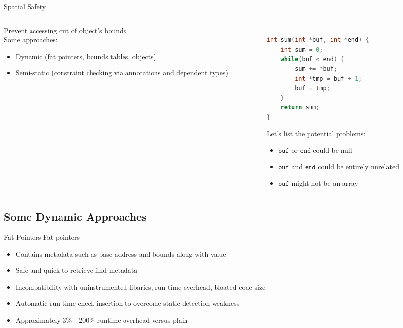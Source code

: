 \documentclass[aspectratio=169]{beamer}
\begin{document}
\begin{frame}[fragile]{Spatial Safety}
  \footnotesize
  \begin{columns}[T]
    \begin{column}{0.45\textwidth}
        Prevent accessing out of object's bounds
        \\
        Some approaches:
        \begin{itemize}
            \item Dynamic \footnotesize{(fat pointers, bounds tables, objects)}
            \item Semi-static \footnotesize{(constraint checking via annotations and dependent types})
        \end{itemize}
    \end{column}
    \begin{column}{0.45\textwidth}
\begin{lstlisting}[language=C,mathescape] %,basicstyle={\footnotesize\ttfamily}]

int sum(int *buf, int *end) {
    int sum = 0;
    while(buf < end) {
        sum += *buf;
        int *tmp = buf + 1;
        buf = tmp;
    }
    return sum;
}
\end{lstlisting}
Let's list the potential problems:
        \begin{itemize}
            \item $\texttt{buf}$ or $\texttt{end}$ could be null
            \item $\texttt{buf}$ and $\texttt{end}$ could be entirely unrelated
            \item $\texttt{buf}$ might not be an array %
        \end{itemize}
    \end{column}
  \end{columns}
\end{frame}

\subsection{Some Dynamic Approaches}

\begin{frame}[fragile]{Fat Pointers}
  \footnotesize
Fat pointers
\begin{itemize}
 \item Contains metadata such as base address and bounds along with value
 \item Safe and quick to retrieve find metadata
 \item Incompatibility with uninstrumented libaries, run-time overhead, bloated code size
 \item Automatic run-time check insertion to overcome static detection weakness
 \item Approximately 3\% - 200\% runtime overhead versus plain
\end{itemize}
\end{frame}
\end{document}
